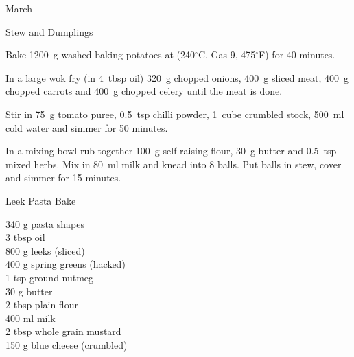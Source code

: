 \begin{menu}{March}
\begin{recipe}{2}{Stew and Dumplings}
    \begin{instructions}
    \item 
    Bake
    1200~g washed baking potatoes
    at
    (240$^{\circ}$C, Gas 9, 475$^{\circ}$F) for 40 minutes.
  \item 
        In a large wok fry
        (in 4~tbsp  oil)
        320~g chopped onions,
        400~g sliced meat,
        400~g chopped carrots
        and
        400~g chopped celery
        until the meat is done.
      \item 
        Stir in
        75~g  tomato puree,
        0.5~tsp  chilli powder,
        1~cube crumbled stock,
        500~ml  cold water
        and simmer for 50 minutes.
      \item 
        In a mixing bowl rub together
        100~g  self raising flour,
        30~g  butter
        and
        0.5~tsp  mixed herbs.
        Mix in
        80~ml  milk
        and knead into 8 balls.
        Put balls in stew, cover and
        simmer for 15 minutes.
      
    \end{instructions}
    \end{recipe}%
  
    \begin{recipe}{2}{Leek Pasta Bake}%
		\begin{ingredients}
		340 g pasta shapes  \\
	3 tbsp oil  \\
	800 g leeks (sliced) \\
	400 g spring greens (hacked) \\
	1 tsp ground nutmeg  \\
	30 g butter  \\
	2 tbsp plain flour  \\
	400 ml milk  \\
	2 tbsp whole grain mustard  \\
	150 g blue cheese (crumbled) \\
	
		\end{ingredients}
	
	

\end{recipe}
\end{menu}
